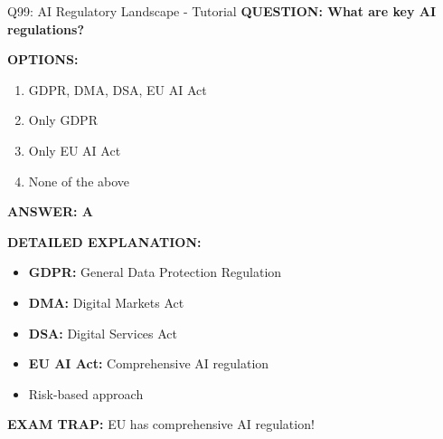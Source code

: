 \documentclass[8pt]{beamer}
\begin{document}
	\begin{frame}{Q99: AI Regulatory Landscape - Tutorial}
		\fontsize{6.5}{7.5}\selectfont
		\textbf{QUESTION: What are key AI regulations?}
		
		\vspace{0.1cm}
		\textbf{OPTIONS:}
		\begin{enumerate}
			\item GDPR, DMA, DSA, EU AI Act
			\item Only GDPR
			\item Only EU AI Act
			\item None of the above
		\end{enumerate}
		
		\vspace{0.1cm}
		\textcolor{myblue}{\textbf{ANSWER: A}}
		
		\vspace{0.1cm}
		\textbf{DETAILED EXPLANATION:}
		\begin{itemize}
			\item \textbf{GDPR:} General Data Protection Regulation
			\item \textbf{DMA:} Digital Markets Act
			\item \textbf{DSA:} Digital Services Act
			\item \textbf{EU AI Act:} Comprehensive AI regulation
			\item Risk-based approach
		\end{itemize}
		
		\vspace{0.1cm}
		\textcolor{myred}{\textbf{EXAM TRAP:}} EU has \textcolor{myblue}{comprehensive AI regulation}!
	\end{frame}
	
\end{document}
